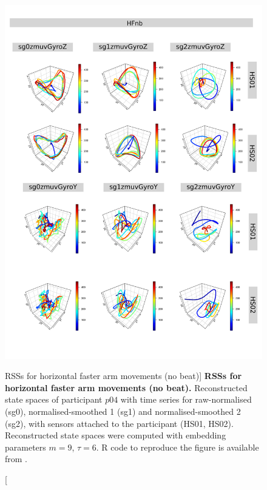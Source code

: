\begin{figure}
\centering
\includegraphics[height=0.8\textheight]{rss_HFnb_p04}
\caption
	[RSSs for horizontal faster arm movements (no beat)]{
	{\bf RSSs for horizontal faster arm movements (no beat).}
	Reconstructed state spaces of participant $p04$
	with time series for raw-normalised (sg0), 
	normalised-smoothed 1 (sg1) and 
	normalised-smoothed 2 (sg2), 
	with sensors attached to the participant (HS01, HS02).
	Reconstructed state spaces were computed with 
	embedding parameters $m=9$, $\tau=6$.
	R code to reproduce the figure is available from \cite{hwum2018}.
        }
     \label{fig:rss_HFnb_p04}
\end{figure}



